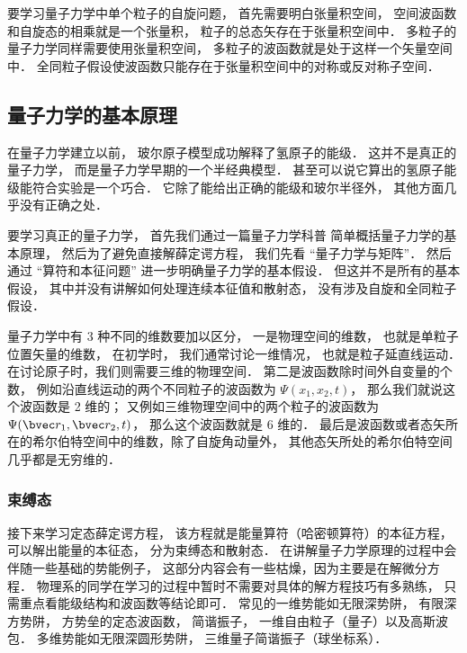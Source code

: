 要学习量子力学中单个粒子的自旋问题， 首先需要明白张量积空间， 空间波函数和自旋态的相乘就是一个张量积， 粒子的总态矢存在于张量积空间中． 多粒子的量子力学同样需要使用张量积空间， 多粒子的波函数就是处于这样一个矢量空间中． 全同粒子假设使波函数只能存在于张量积空间中的对称或反对称子空间．

\subsection{量子力学的基本原理}

在量子力学建立以前， 玻尔原子模型成功解释了氢原子的能级． 这并不是真正的量子力学， 而是量子力学早期的一个半经典模型． 甚至可以说它算出的氢原子能级能符合实验是一个巧合． 它除了能给出正确的能级和玻尔半径外， 其他方面几乎没有正确之处．

要学习真正的量子力学， 首先我们通过一篇量子力学科普 简单概括量子力学的基本原理， 然后为了避免直接解薛定谔方程， 我们先看 “量子力学与矩阵”． 然后通过 “算符和本征问题” 进一步明确量子力学的基本假设． 但这并不是所有的基本假设， 其中并没有讲解如何处理连续本征值和散射态， 没有涉及自旋和全同粒子假设．

量子力学中有 3 种不同的维数要加以区分， 一是物理空间的维数， 也就是单粒子位置矢量的维数， 在初学时， 我们通常讨论一维情况， 也就是粒子延直线运动． 在讨论原子时，我们则需要三维的物理空间． 第二是波函数除时间外自变量的个数， 例如沿直线运动的两个不同粒子的波函数为 $\Psi(x_1,x_2,t)$， 那么我们就说这个波函数是 2 维的； 又例如三维物理空间中的两个粒子的波函数为 $\Psi(\bvec r_1, \bvec r_2, t)$， 那么这个波函数就是 6 维的． 最后是波函数或者态矢所在的希尔伯特空间中的维数，除了自旋角动量外， 其他态矢所处的希尔伯特空间几乎都是无穷维的．

\subsubsection{束缚态}
接下来学习定态薛定谔方程， 该方程就是能量算符（哈密顿算符）的本征方程， 可以解出能量的本征态， 分为束缚态和散射态． 在讲解量子力学原理的过程中会伴随一些基础的势能例子， 这部分内容会有一些枯燥，因为主要是在解微分方程． 物理系的同学在学习的过程中暂时不需要对具体的解方程技巧有多熟练， 只需重点看能级结构和波函数等结论即可． 常见的一维势能如无限深势阱， 有限深方势阱， 方势垒的定态波函数， 简谐振子， 一维自由粒子（量子）以及高斯波包． 多维势能如无限深圆形势阱， 三维量子简谐振子（球坐标系）．

